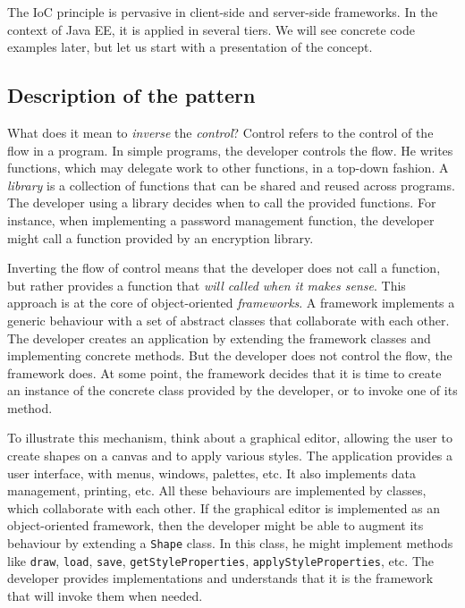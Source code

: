 The \ac{IoC} principle is pervasive in client-side and server-side frameworks. In the context of Java EE, it is applied in several tiers. We will see concrete code examples later, but let us start with a presentation of the concept.

\subsection{Description of the pattern}


What does it mean to \emph{inverse} the \emph{control}? Control refers to the control of the flow in a program. In simple programs, the developer controls the flow. He writes functions, which may delegate work to other functions, in a top-down fashion. A \emph{library} is a collection of functions that can be shared and reused across programs. The developer using a library decides when to call the provided functions. For instance, when implementing a password management function, the developer might call a function provided by an encryption library.


Inverting the flow of control means that the developer does not call a function, but rather provides a function that \emph{will called when it makes sense}. This approach is at the core of object-oriented \emph{frameworks}. A framework implements a generic behaviour with a set of abstract classes that collaborate with each other. The developer creates an application by extending the framework classes and implementing concrete methods. But the developer does not control the flow, the framework does. At some point, the framework decides that it is time to create an instance of the concrete class provided by the developer, or to invoke one of its method.

To illustrate this mechanism, think about a graphical editor, allowing the user to create shapes on a canvas and to apply various styles. The application provides a user interface, with menus, windows, palettes, etc. It also implements data management, printing, etc. All these behaviours are implemented by classes, which collaborate with each other. If the graphical editor is implemented as an object-oriented framework, then the developer might be able to augment its behaviour by extending a \texttt{Shape} class. In this class, he might implement methods like \texttt{draw}, \texttt{load}, \texttt{save}, \texttt{getStyleProperties}, \texttt{applyStyleProperties}, etc. The developer provides implementations and understands that it is the framework that will invoke them when needed.

